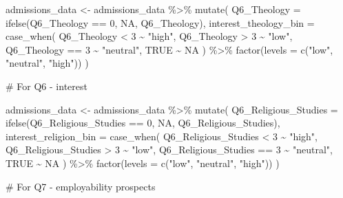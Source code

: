 \documentclass[
  letterpaper,
  DIV=11,
  numbers=noendperiod]{scrartcl}
\newenvironment{Shaded}{\begin{snugshade}}{\end{snugshade}}
\newcommand{\AttributeTok}[1]{\textcolor[rgb]{0.40,0.45,0.13}{#1}}
\newcommand{\CommentTok}[1]{\textcolor[rgb]{0.37,0.37,0.37}{#1}}
\newcommand{\ConstantTok}[1]{\textcolor[rgb]{0.56,0.35,0.01}{#1}}
\newcommand{\DecValTok}[1]{\textcolor[rgb]{0.68,0.00,0.00}{#1}}
\newcommand{\FunctionTok}[1]{\textcolor[rgb]{0.28,0.35,0.67}{#1}}
\newcommand{\NormalTok}[1]{\textcolor[rgb]{0.00,0.23,0.31}{#1}}
\newcommand{\OtherTok}[1]{\textcolor[rgb]{0.00,0.23,0.31}{#1}}
\newcommand{\SpecialCharTok}[1]{\textcolor[rgb]{0.37,0.37,0.37}{#1}}
\newcommand{\StringTok}[1]{\textcolor[rgb]{0.13,0.47,0.30}{#1}}
\begin{document}
\begin{Shaded}
\begin{Highlighting}[]
\NormalTok{admissions\_data }\OtherTok{\textless{}{-}}\NormalTok{ admissions\_data }\SpecialCharTok{\%\textgreater{}\%}
  \FunctionTok{mutate}\NormalTok{(}
    \AttributeTok{Q6\_Theology =} \FunctionTok{ifelse}\NormalTok{(Q6\_Theology }\SpecialCharTok{==} \DecValTok{0}\NormalTok{, }\ConstantTok{NA}\NormalTok{, Q6\_Theology),}
    \AttributeTok{interest\_theology\_bin =} \FunctionTok{case\_when}\NormalTok{(}
\NormalTok{      Q6\_Theology }\SpecialCharTok{\textless{}} \DecValTok{3} \SpecialCharTok{\textasciitilde{}} \StringTok{"high"}\NormalTok{,}
\NormalTok{      Q6\_Theology }\SpecialCharTok{\textgreater{}} \DecValTok{3} \SpecialCharTok{\textasciitilde{}} \StringTok{"low"}\NormalTok{,}
\NormalTok{      Q6\_Theology }\SpecialCharTok{==} \DecValTok{3} \SpecialCharTok{\textasciitilde{}} \StringTok{"neutral"}\NormalTok{,}
      \ConstantTok{TRUE} \SpecialCharTok{\textasciitilde{}} \ConstantTok{NA}
\NormalTok{    ) }\SpecialCharTok{\%\textgreater{}\%} \FunctionTok{factor}\NormalTok{(}\AttributeTok{levels =} \FunctionTok{c}\NormalTok{(}\StringTok{"low"}\NormalTok{, }\StringTok{"neutral"}\NormalTok{, }\StringTok{"high"}\NormalTok{))}
\NormalTok{  )}

\CommentTok{\# For Q6 {-} interest}

\NormalTok{admissions\_data }\OtherTok{\textless{}{-}}\NormalTok{ admissions\_data }\SpecialCharTok{\%\textgreater{}\%}
  \FunctionTok{mutate}\NormalTok{(}
    \AttributeTok{Q6\_Religious\_Studies =} \FunctionTok{ifelse}\NormalTok{(Q6\_Religious\_Studies }\SpecialCharTok{==} \DecValTok{0}\NormalTok{, }\ConstantTok{NA}\NormalTok{, Q6\_Religious\_Studies),}
    \AttributeTok{interest\_religion\_bin =} \FunctionTok{case\_when}\NormalTok{(}
\NormalTok{      Q6\_Religious\_Studies }\SpecialCharTok{\textless{}} \DecValTok{3} \SpecialCharTok{\textasciitilde{}} \StringTok{"high"}\NormalTok{,}
\NormalTok{      Q6\_Religious\_Studies }\SpecialCharTok{\textgreater{}} \DecValTok{3} \SpecialCharTok{\textasciitilde{}} \StringTok{"low"}\NormalTok{,}
\NormalTok{      Q6\_Religious\_Studies }\SpecialCharTok{==} \DecValTok{3} \SpecialCharTok{\textasciitilde{}} \StringTok{"neutral"}\NormalTok{,}
      \ConstantTok{TRUE} \SpecialCharTok{\textasciitilde{}} \ConstantTok{NA}
\NormalTok{    ) }\SpecialCharTok{\%\textgreater{}\%} \FunctionTok{factor}\NormalTok{(}\AttributeTok{levels =} \FunctionTok{c}\NormalTok{(}\StringTok{"low"}\NormalTok{, }\StringTok{"neutral"}\NormalTok{, }\StringTok{"high"}\NormalTok{))}
\NormalTok{  )}

\CommentTok{\# For Q7 {-} employability prospects}


\end{Highlighting}
\end{Shaded}
\end{document}
